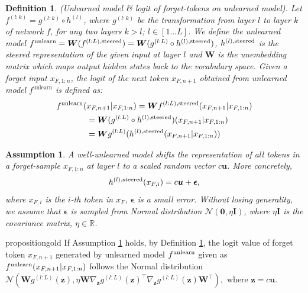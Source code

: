 \documentclass[letterpaper]{article} %
\newtheorem{definition}{Definition}
\newtheorem{assumption}{Assumption}
\begin{document}
\begin{definition}
\label{def1}
(Unlearned model \& logit of forget-tokens on unlearned model). Let $f^{(l:k)} = g^{(l:k)} \circ h^{(l)}$, where $g^{(l:k)}$ be the transformation from layer $l$ to layer $k$ of network $f$, for any two layers $k > l$; $l\in [1...L]$. We define the unlearned model $f^{\textnormal{unlearn}} = \bm W( f^{(l:L),
\textnormal{steered}})=\bm W(g^{(l:L)}\circ h^{(l),\textnormal{steered}})$, $h^{(l), \textnormal{steered}}$ is the steered representation of the given input at layer $l$ and $\bm W$ is the unembedding matrix which maps output hidden states back to the vocabulary space. Given a forget input $x_{F,1:n}$, the logit of the next token $x_{F,n+1}$ obtained from unlearned model $f^{\text{unlearn}}$ is defined as:
\begin{align}
    f^{\text{unlearn}}(&x_{F,n+1}|x_{F,1:n}) = \bm W f^{(l:L),\text{steered}}(x_{F,n+1}|x_{F,1:n})\nonumber\\
    &=\bm W(g^{(l:L)}\circ h^{(l),\textnormal{steered}})(x_{F,n+1}|x_{F,1:n})\nonumber\\
    &=\bm Wg^{(l:L)}(h^{(l),\textnormal{steered}}(x_{F,n+1}|x_{F,1:n}))\label{eq2}
\end{align}
\end{definition}
\begin{assumption} A well-unlearned model shifts the representation of all tokens in a forget-sample $x_{F,1:n}$ at layer $l$ to a scaled random vector $c\bm u$. More concretely,
\begin{align}
    h^{(l),\textnormal{steered}}(x_{F,i}) = c \bm u + \bm\epsilon, \label{eq3}
\end{align}
where $x_{F,i}$ is the $i$-th token in $x_F$, $\bm{\epsilon}$ is a small error. Without losing generality, we assume that $\bm \epsilon$ is sampled from Normal distribution $\mathcal{N}(\bm 0, \eta \bm I)$, where $\eta \bm I$ is the covariance matrix, $\eta \in \mathbb{R}$.
\label{assumption1}
\end{assumption} 
\begin{restatable}{proposition}{gold}
\label{theorem1}
If Assumption \ref{assumption1} holds, by Definition \ref{def1}, the logit value of forget token $x_{F,n+1}$ generated by unlearned model $f^{\textnormal{unlearn}}$ given as $f^{\textnormal{unlearn}}(x_{F,n+1}|x_{F,1:n})$
follows the Normal distribution 
    $\mathcal{N}\left(\bm Wg^{(l:L)}(\bm z), \eta\bm W\nabla_{\bm z}g^{(l:L)}(\bm z)^{\top}\nabla_{\bm z}g^{(l:L)}(\bm z)\bm W^{\top}\right),\label{eq5}$
where $\bm z = c \bm u$.
\end{restatable}
\end{document}
